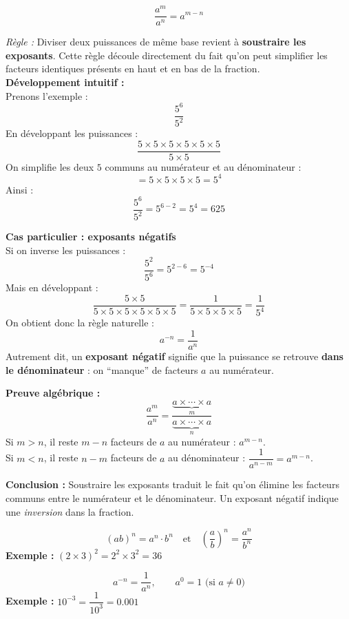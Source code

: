 \documentclass[11pt,a4paper]{article}
\newcommand{\rulebox}[3]{
\begin{tcolorbox}[colback=#1!10!white,colframe=#1!60!black,title=\textbf{#2}]
#3
\end{tcolorbox}
}
\begin{document}
\rulebox{orange}{Division de puissances de même base}{
\[
\dfrac{a^m}{a^n} = a^{m-n}
\]

\textit{Règle :}  
Diviser deux puissances de même base revient à \textbf{soustraire les exposants}.  
Cette règle découle directement du fait qu’on peut simplifier les facteurs identiques présents en haut et en bas de la fraction.\\[0.3cm]

\textbf{Développement intuitif :}\\[0.2cm]
Prenons l’exemple :
\[
\dfrac{5^6}{5^2}
\]
En développant les puissances :
\[
\dfrac{5\times5\times5\times5\times5\times5}{5\times5}
\]
On simplifie les deux $5$ communs au numérateur et au dénominateur :
\[
= 5\times5\times5\times5 = 5^4
\]
Ainsi :
\[
\dfrac{5^6}{5^2} = 5^{6-2} = 5^4 = 625
\]

\textbf{Cas particulier : exposants négatifs}\\[0.2cm]
Si on inverse les puissances :
\[
\dfrac{5^2}{5^6} = 5^{2-6} = 5^{-4}
\]
Mais en développant :
\[
\dfrac{5\times5}{5\times5\times5\times5\times5\times5}
= \dfrac{1}{5\times5\times5\times5} = \dfrac{1}{5^4}
\]
On obtient donc la règle naturelle :
\[
a^{-n} = \dfrac{1}{a^n}
\]
Autrement dit, un \textbf{exposant négatif} signifie que la puissance se retrouve \textbf{dans le dénominateur} : on “manque” de facteurs $a$ au numérateur.

\textbf{Preuve algébrique :}\\[0.2cm]
\[
\dfrac{a^m}{a^n} = \dfrac{\underbrace{a\times\cdots\times a}_{m}}{\underbrace{a\times\cdots\times a}_{n}}
\]
Si $m>n$, il reste $m-n$ facteurs de $a$ au numérateur : $a^{m-n}$.\\
Si $m<n$, il reste $n-m$ facteurs de $a$ au dénominateur : $\dfrac{1}{a^{n-m}} = a^{m-n}$.

\textbf{Conclusion :}  
Soustraire les exposants traduit le fait qu’on élimine les facteurs communs entre le numérateur et le dénominateur.  
Un exposant négatif indique une \textit{inversion} dans la fraction.
}

\rulebox{orange}{Puissance d’un produit et d’un quotient (fraction)}{
\[
(ab)^n = a^n \cdot b^n \quad\text{et}\quad \left(\dfrac{a}{b}\right)^n = \dfrac{a^n}{b^n}
\]
\textbf{Exemple : } $(2\times3)^2 = 2^2 \times 3^2 = 36$
}

\rulebox{orange}{Puissance négative et nulle}{
\[
a^{-n} = \dfrac{1}{a^n}, \qquad a^0 = 1 \text{ (si $a\neq 0$)}
\]
\textbf{Exemple : } $10^{-3} = \dfrac{1}{10^3} = 0.001$
}
\end{document}
